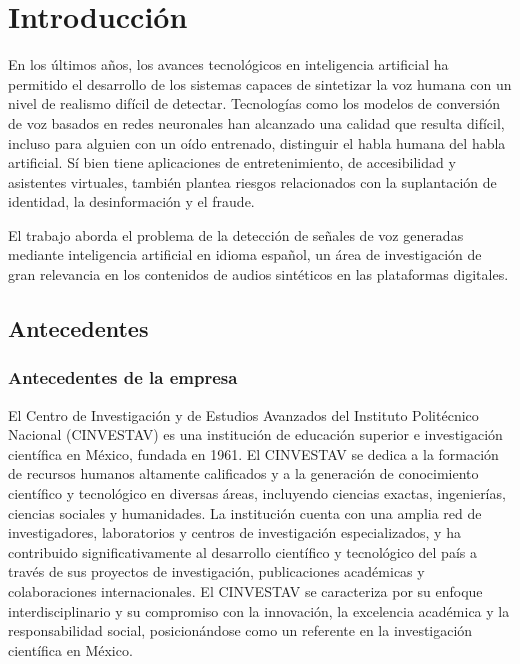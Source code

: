 \section{Introducción}
\label{ch:introduccion}

En los últimos años, los avances tecnológicos en inteligencia artificial ha permitido el desarrollo de los sistemas capaces de sintetizar la voz humana con un nivel de realismo difícil de detectar. Tecnologías como los modelos de conversión de voz basados en redes neuronales han alcanzado una calidad que resulta difícil, incluso para alguien con un oído entrenado, distinguir el habla humana del habla artificial. Sí bien tiene aplicaciones de entretenimiento, de accesibilidad y asistentes virtuales, también plantea riesgos relacionados con la suplantación de identidad, la desinformación y el fraude.

El trabajo aborda el problema de la detección de señales de voz generadas mediante inteligencia artificial en idioma español, un área de investigación de gran relevancia en los contenidos de audios sintéticos en las plataformas digitales.
 
\subsection{Antecedentes}
\label{sec:antecedentes}


\subsubsection{Antecedentes de la empresa}
\label{subsec: antecedentes_empresa}

El Centro de Investigación y de Estudios Avanzados del Instituto Politécnico Nacional (CINVESTAV) es una institución de educación superior e investigación científica en México, fundada en 1961. El CINVESTAV se dedica a la formación de recursos humanos altamente calificados y a la generación de conocimiento científico y tecnológico en diversas áreas, incluyendo ciencias exactas, ingenierías, ciencias sociales y humanidades. La institución cuenta con una amplia red de investigadores, laboratorios y centros de investigación especializados, y ha contribuido significativamente al desarrollo científico y tecnológico del país a través de sus proyectos de investigación, publicaciones académicas y colaboraciones internacionales. El CINVESTAV se caracteriza por su enfoque interdisciplinario y su compromiso con la innovación, la excelencia académica y la responsabilidad social, posicionándose como un referente en la investigación científica en México.

